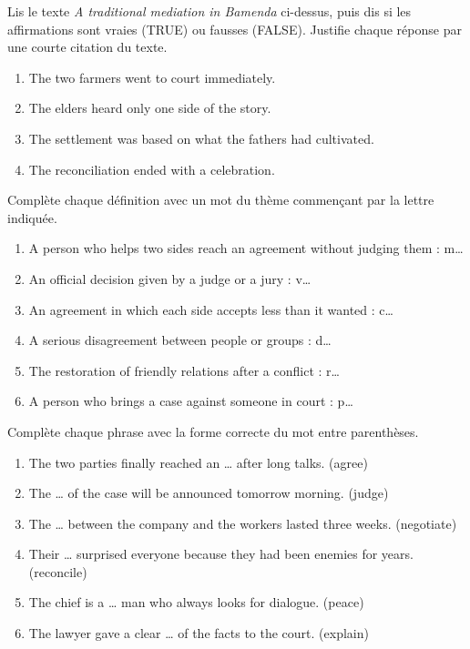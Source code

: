 \documentclass[11pt]{article}
\begin{document}
\begin{exercice}
Lis le texte \emph{A traditional mediation in Bamenda} ci-dessus, puis dis si les affirmations sont vraies (TRUE) ou fausses (FALSE). Justifie chaque réponse par une courte citation du texte.

\begin{enumerate}
\item The two farmers went to court immediately.
\item The elders heard only one side of the story.
\item The settlement was based on what the fathers had cultivated.
\item The reconciliation ended with a celebration.
\end{enumerate}
\end{exercice}

\begin{exercice}
Complète chaque définition avec un mot du thème commençant par la lettre indiquée.

\begin{enumerate}
\item A person who helps two sides reach an agreement without judging them : m\ldots
\item An official decision given by a judge or a jury : v\ldots
\item An agreement in which each side accepts less than it wanted : c\ldots
\item A serious disagreement between people or groups : d\ldots
\item The restoration of friendly relations after a conflict : r\ldots
\item A person who brings a case against someone in court : p\ldots
\end{enumerate}
\end{exercice}

\begin{exercice}
Complète chaque phrase avec la forme correcte du mot entre parenthèses.

\begin{enumerate}
\item The two parties finally reached an \ldots{} after long talks. (agree)
\item The \ldots{} of the case will be announced tomorrow morning. (judge)
\item The \ldots{} between the company and the workers lasted three weeks. (negotiate)
\item Their \ldots{} surprised everyone because they had been enemies for years. (reconcile)
\item The chief is a \ldots{} man who always looks for dialogue. (peace)
\item The lawyer gave a clear \ldots{} of the facts to the court. (explain)
\end{enumerate}
\end{exercice}
\end{document}
